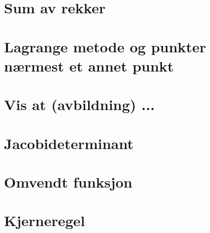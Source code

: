 \documentclass{article}
\begin{document}
  \section*{Sum av rekker}
    
  \section*{Lagrange metode og punkter nærmest et annet punkt}
    
  \section*{Vis at (avbildning) ...}
    
  \section*{Jacobideterminant}
    
  \section*{Omvendt funksjon}
    
  \section*{Kjerneregel}
    
\end{document}
